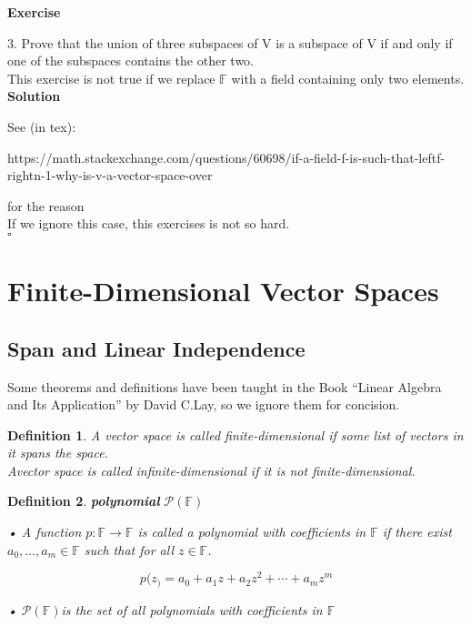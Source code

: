 \documentclass{article}
\newtheorem{definition}{Definition}[subsection]
\newenvironment{exercise}{%
{\textbf{Exercise\\}
    }
}{
}
\newenvironment{solution}{%
{
    \textbf{Solution\\}
    }
}{
  \hfill $\square$ 
  \par\bigskip 
}
\newcommand{\FF}{\mathbb{F}}
\begin{document}
\begin{CJK}{UTF8}{gkai}
\begin{exercise}
3. Prove that the union of three subspaces of V is a subspace of V if and only if one of the subspaces contains the other two.\\


This exercise is not true if we replace $\FF$ with a field containing only two elements.\\
\end{exercise}
\begin{solution}
See (in tex):

https://math.stackexchange.com/questions/60698/if-a-field-f-is-such-that-leftf-rightn-1-why-is-v-a-vector-space-over

for the reason\\

If we ignore this case, this exercises is not so hard.\\
\end{solution}


\section{Finite-Dimensional Vector Spaces}

\subsection{Span and Linear Independence}

Some theorems and definitions have been taught in the Book ``Linear Algebra and Its Application'' by David C.Lay, so we ignore them for concision.

\begin{definition}
    A vector space is called finite-dimensional if some list of vectors in it spans the space.\\   

    Avector space is called infinite-dimensional if it is not finite-dimensional.\\
\end{definition}

\begin{definition}
    \textbf{polynomial} $\mathcal{P} (\FF)$

 • A function $p: \FF \rightarrow \FF$ is called a polynomial with coefficients in $\FF$ if there exist $a_0, \ldots,a_m \in \FF$ such that for all $z \in \FF$.

 \[p(z_) = a_0 +a_1 z +a_2 z^2 +\cdots+a_m z^m\]

 • $\mathcal{P}(\FF)$is the set of all polynomials with coefficients in $\FF$
\end{definition}


\end{CJK}
\end{document}
